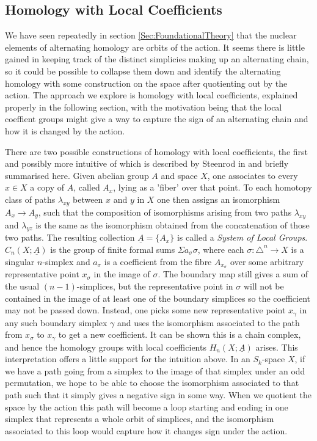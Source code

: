 \documentclass[11pt,a4paper,twoside]{article}
\theoremstyle{plain}
\theoremstyle{definition}
\theoremstyle{definition}
\theoremstyle{definition}
\theoremstyle{definition}
\theoremstyle{definition}
\begin{document}
\subsection{Homology with Local Coefficients}
We have seen repeatedly in section \ref{Sec:FoundationalTheory} that the nuclear elements of alternating homology are orbits of the action. It seems there is little gained in keeping track of the distinct simplicies making up an alternating chain, so it could be possible to collapse them down and identify the alternating homology with some construction on the space after quotienting out by the action. The approach we explore is homology with local coefficients, explained properly in the following section, with the motivation being that the local coeffient groups might give a way to capture the sign of an alternating chain and how it is changed by the action.

There are two possible constructions of homology with local coefficients, the first and possibly more intuitive of which is described by Steenrod in \cite{Steenrodco} and briefly summarised here. Given abelian group $A$ and space $X$, one associates to every $x\in X$ a copy of $A$, called $A_x$, lying as a 'fiber' over that point. To each homotopy class of paths $\lambda_{xy}$ between $x$ and $y$ in $X$ one then assigns an isomorphism $A_x\rightarrow A_y$, such that the composition of isomorphisms arising from two paths $\lambda_{xy}$ and $\lambda_{yz}$ is the same as the isomorphism obtained from the concatenation of those two paths. The resulting collection $\underline{A}=\{A_x\}$ is called a \emph{System of Local Groups}. $C_n(X;\underline A)$ is the group of finite formal sums $\Sigma a_\sigma\sigma$, where each $\sigma\!:\!\triangle^n\rightarrow X$ is a singular $n$-simplex and $a_\sigma$ is a coefficient from the fibre $A_{x_\sigma}$ over some arbitrary representative point $x_\sigma$ in the image of $\sigma$. The boundary map still gives a sum of the usual $(n\!-\!1)$-simplices, but the representative point in $\sigma$ will not be contained in the image of at least one of the boundary simplices so the coefficient may not be passed down. Instead, one picks some new representative point $x_\gamma$ in any such boundary simplex $\gamma$ and uses the isomorphism associated to the path from $x_\sigma$ to $x_\gamma$ to get a new coefficient. It can be shown this is a chain complex, and hence the homology groups with local coefficients $H_n(X;\underline A)$ arises. This interpretation offers a little support for the intuition above. In an $S_k$-space $X$, if we have a path going from a simplex to the image of that simplex under an odd permutation, we hope to be able to choose the isomorphism associated to that path such that it simply gives a negative sign in some way. When we quotient the space by the action this path will become a loop starting and ending in one simplex that represents a whole orbit of simplices, and the isomorphism associated to this loop would capture how it changes sign under the action.
\end{document}

